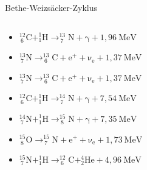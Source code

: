 \documentclass[aspectratio=169,xcolor=dvipsnames,14pt]{beamer}
\begin{document}
    {
    \begin{frame}{Bethe-Weizsäcker-Zyklus}
        \begin{columns}
            
            \begin{column}{0.7\textwidth}
                \begin{itemize}
                    \color{LightGrey}
                    \item
                    \begin{math}
                        {\displaystyle \mathrm {_{\ 6}^{12}C+_{1}^{1}H\to _{\ 7}^{13}N+\gamma+1,96 \ MeV}}
                    \end{math}

                    \item 
                    \begin{math}
                        {\displaystyle \mathrm {_{\ 7}^{13}N \to _{\ 6}^{13}C+ {e}^{+} + \nu_{e}+1,37 \ MeV }}
                    \end{math}

                    \item \begin{math}
                        {\displaystyle \mathrm {_{\ 7}^{13}N \to _{\ 6}^{13}C+ {e}^{+} + \nu_{e}+1,37 \ MeV }}
                    \end{math}

                    \item
                    \begin{math}
                        {\displaystyle \mathrm {_{\ 6}^{12}C+_{1}^{1}H\to _{\ 7}^{14}N+\gamma+7,54 \ MeV}}
                    \end{math}

                    \item
                    \begin{math}
                        {\displaystyle \mathrm {_{\ 7}^{14}N+_{1}^{1}H\to _{\ 8}^{15}N+\gamma+7,35 \ MeV}}
                    \end{math}

                    \item
                    \begin{math}
                        {\displaystyle \mathrm {_{\ 8}^{15}O \to _{\ 7}^{15}N+{e}^{+} + \nu_{e}+1,73 \ MeV}}
                    \end{math}

                    \item
                    \begin{math}
                        {\displaystyle \mathrm {_{\ 7}^{15}N+_{1}^{1}H \to _{\ 6}^{12}C+_{2}^{4}He+4,96 \ MeV}}
                    \end{math}
                \end{itemize}
            \end{column}


\end{columns}
\end{frame}}
\end{document}
